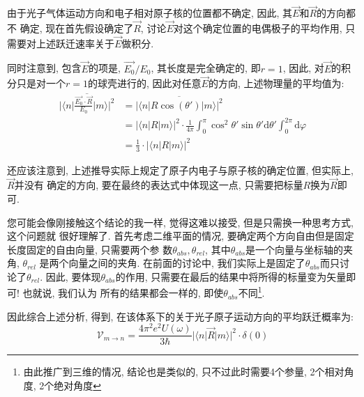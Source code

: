 \documentclass[a4paper, 11pt]{article}
\begin{document}
\begin{spacing}{1.2}
          由于光子气体运动方向和电子相对原子核的位置都不确定, 因此, 其$\vec{E}$和$\vec{R}$的方向都不
          确定, 现在首先假设确定了$\vec{R}$, 讨论$\vec{E}$对这个确定位置的电偶极子的平均作用, 
          只需要对上述跃迁速率关于$\vec{E}$做积分. 

          同时注意到, 包含$\vec{E}$的项是, $\vec{E_0}/{E_0}$, 其长度是完全确定的, 即$r = 1$, 因此, 
          对$\vec{E}$的积分只是对一个$r = 1$的球壳进行的, 因此对任意$\vec{E}$的方向, 上述物理量的平均值为:
          \begin{equation}
            \begin{aligned}
              \overline{|\langle{}n|\frac{\vec{E_0}\cdot\vec{R}}{E_0}|m\rangle|^2}
              &= \overline{|\langle{}n|R\cos{(\theta')}|m\rangle|^2}\\
              &= |\langle{}n|R|m\rangle|^2 \cdot \frac{1}{4\pi}\int_0^\pi\cos^2\theta'\sin\theta'\mathrm{d}\theta'
                \int_0^{2\pi}\mathrm{d}\varphi\\
              &= \frac{1}{3}\cdot|\langle{}n|R|m\rangle|^2 
            \end{aligned}
          \end{equation}


          还应该注意到, 上述推导实际上规定了原子内电子与原子核的确定位置, 但实际上, $\vec{R}$并没有
          确定的方向, 要在最终的表达式中体现这一点, 只需要把标量$R$换为$\vec{R}$即可.
          
          您可能会像刚接触这个结论的我一样, 觉得这难以接受, 但是只需换一种思考方式, 这个问题就
          很好理解了. 首先考虑二维平面的情况, 要确定两个方向自由但是固定长度固定的自由向量, 只需要两个参
          数$\theta_{abs}, \theta_{rel}$, 其中$\theta_{abs}$是一个向量与坐标轴的夹角, $\theta_{rel}$
          是两个向量之间的夹角. 在前面的讨论中, 我们实际上是固定了$\theta_{abs}$而只讨论了$\theta_{rel}$. 
          因此, 要体现$\theta_{abs}$的作用, 只需要在最后的结果中将所得的标量变为矢量即可! 也就说, 我们认为
          所有的结果都会一样的, 即使$\theta_{abs}$不同\footnote{由此推广到三维的情况, 结论也是类似的, 
          只不过此时需要4个参量, 2个相对角度, 2个绝对角度}.

          因此综合上述分析, 得到, 在该体系下的关于光子原子运动方向的平均跃迁概率为:
          \begin{equation}
            \label{V_single}
            \mathcal{V}_{m\to{}n} = \frac{4\pi^2e^2U(\omega)}{3\hbar}
                                  |\langle{}n|\vec{R}|m\rangle|^2
                                    \cdot\delta(0)
          \end{equation}
          

\end{spacing}
\end{document}
